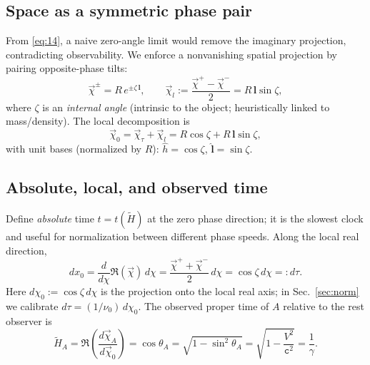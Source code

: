 \documentclass[11pt]{article}
\numberwithin{equation}{section}
\begin{document}
\subsection{Space as a symmetric phase pair}
From \eqref{eq:14}, a naive zero-angle limit would remove the imaginary projection, contradicting observability. We enforce a nonvanishing spatial projection by pairing opposite-phase tilts:
\begin{equation}
\vec{\chi}^{\pm}=R\,e^{\pm\zeta\,\mathbf{l}},\qquad
\vec{\chi}_l:=\frac{\vec{\chi}^+-\vec{\chi}^-}{2}=R\,\mathbf{l}\sin\zeta,
\label{eq:311}
\end{equation}
where $\zeta$ is an \emph{internal angle} (intrinsic to the object; heuristically linked to mass/density). The local decomposition is
\begin{equation}
\vec{\chi}_0=\vec{\chi}_\tau+\vec{\chi}_l
=R\cos\zeta+R\,\mathbf{l}\sin\zeta,
\label{eq:312}
\end{equation}
with unit bases (normalized by $R$): $\hat{h}=\cos\zeta$, $\hat{\mathbf{l}}=\sin\zeta$.

\subsection{Absolute, local, and observed time}
Define \emph{absolute} time $t=t(\tilde{H})$ at the zero phase direction; it is the slowest clock and useful for normalization between different phase speeds. Along the local real direction,
\begin{equation}
dx_0=\frac{d}{d\chi}\Re(\vec{\chi})\,d\chi
=\frac{\vec{\chi}^++\vec{\chi}^-}{2}\,d\chi
=\cos\zeta\,d\chi
=:d\tau.
\label{eq:321}
\end{equation}
Here $d\chi_0:=\cos\zeta\,d\chi$ is the projection onto the local real axis; in Sec.~\ref{sec:norm} we calibrate $d\tau=(1/\nu_0)\,d\chi_0$. The observed proper time of $A$ relative to the rest observer is
\begin{equation}
\tilde{H}_A=\Re\!\left(\frac{d\vec{\chi}_A}{d\vec{\chi}_0}\right)
=\cos\theta_A
=\sqrt{1-\sin^2\theta_A}
=\sqrt{1-\frac{V^2}{\mathtt{c}^2}}
=\frac{1}{\gamma}.
\label{eq:322}
\end{equation}
\end{document}
